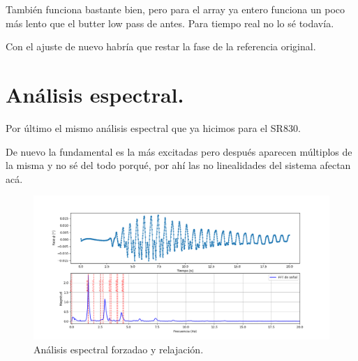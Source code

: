 También funciona bastante bien, pero para el array ya entero funciona un poco más lento que el butter low pass de antes. Para tiempo real no lo sé todavía.  

Con el ajuste de nuevo habría que restar la fase de la referencia original. 


\section*{Análisis espectral.} %
Por último el mismo análisis espectral que ya hicimos para el SR830.


De nuevo la fundamental es la más excitadas pero después aparecen múltiplos de la misma y no sé del todo porqué, por ahí las no linealidades del sistema afectan acá. 

\begin{figure}[!ht] %
	\centering
	\includegraphics[width=0.987\linewidth]{"Figures/09_06_2025/Análisis espectral señal frozado"}
	\caption{Análisis espectral forzadao y relajación.}
	\label{fig:analisis-espectral-senal-frozado}
\end{figure}
